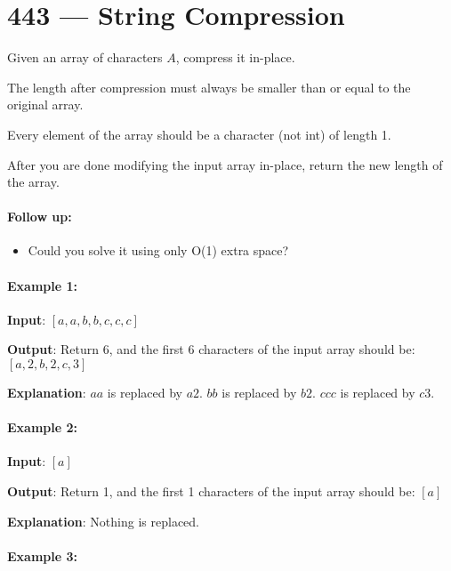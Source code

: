 \section{443 --- String Compression}
Given an array of characters $A$, compress it in-place.

The length after compression must always be smaller than or equal to the original array.

Every element of the array should be a character (not int) of length 1.

After you are done modifying the input array in-place, return the new length of the array.

 
\paragraph{Follow up:}

\begin{itemize}
\item Could you solve it using only O(1) extra space?
\end{itemize}

 
\paragraph{Example 1:}

\begin{flushleft}
\textbf{Input}: $[a,a,b,b,c,c,c]$

\textbf{Output}: Return 6, and the first 6 characters of the input array should be: $[a,2,b,2,c,3]$

\textbf{Explanation}: $aa$ is replaced by $a2$. $bb$ is replaced by $b2$. $ccc$ is replaced by $c3$.
 
\end{flushleft}

\paragraph{Example 2:}

\begin{flushleft}
\textbf{Input}: $[a]$

\textbf{Output}: Return 1, and the first 1 characters of the input array should be: $[a]$

\textbf{Explanation}: Nothing is replaced.

\end{flushleft}


\paragraph{Example 3:}

